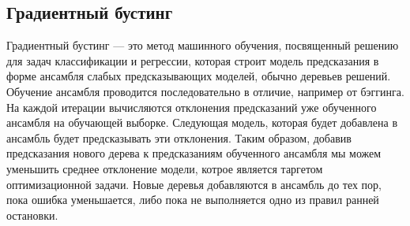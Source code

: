 \iffalse
Фундаментальная идея метода опорных векторов заключается в поиске гиперплоскости с "лучшим" отступом. расстоянием между гиперплоскостью и опорными векторами -- векторами, которые ближе всего находятся к разделяющей гиперплоскости. 
\newline
Если выборка линейно разделима, то гиперплоскость, разделяющая два класса, имеет вид:
\[
\langle x,w\rangle + b = 0
\]
Для надежного разделения классов необходимо, чтобы расстояние между разделяющими гиперплоскостями было как можно большим, т.е. $\norm{w}$ было как можно меньше. Таким образом ставится задача нахождения минимума квадратичного функционала $ \frac{\langle w,w\rangle}{2} $.
\newline
Если же выборка линейно неразделима, то применяется т.н. ядерный трюк -- пространство признаков вкладывается в пространство большей размерности $H$ с помощью отображения $\varphi: X \to H$. Полагают, что $H$ -- гильбертово пространство, и тогда, рассматривая алгоритм опорных векторов для образов $\varphi(x_i)$ решение задачи сводится к линейно разделимому случаю, т.е. разделяющая функция ищется в виде:
\[
f(x) = \langle w,\varphi(x)\rangle + b
\]
Неоспоримым плюсом этого метода является то, что он сводится к решению задачи квадратичного программирования в выпуклой области, которая всегда имеет единственное решение.\fi 

\subsection{Градиентный бустинг}
Градиентный бустинг — это метод машинного обучения, посвященный решению для задач классификации и регрессии, которая строит модель предсказания в форме ансамбля слабых предсказывающих моделей, обычно деревьев решений. Обучение
ансамбля проводится последовательно в отличие, например от бэггинга. На
каждой итерации вычисляются отклонения предсказаний уже обученного ансамбля на обучающей выборке. Следующая модель, которая будет добавлена в ансамбль будет предсказывать эти отклонения. Таким образом, добавив
предсказания нового дерева к предсказаниям обученного ансамбля мы можем
уменьшить среднее отклонение модели, котрое является таргетом оптимизационной задачи. Новые деревья добавляются в ансамбль до тех пор, пока ошибка
уменьшается, либо пока не выполняется одно из правил ранней остановки.


